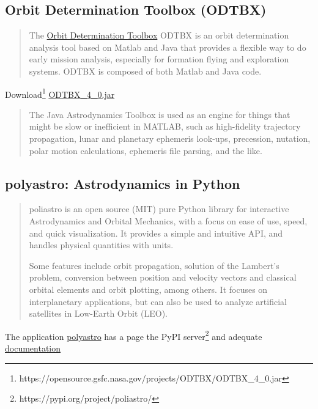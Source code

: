 \documentclass[a4paper,10pt]{article}
\begin{document}
\subsection{Orbit Determination Toolbox (ODTBX)}
\begin{quotation}
The \href{https://opensource.gsfc.nasa.gov/projects/ODTBX/}{Orbit Determination Toolbox} ODTBX is an orbit determination analysis tool based on Matlab and Java that provides a flexible way to do early mission analysis, especially for formation flying and exploration systems. ODTBX is composed of both Matlab and Java code.
\end{quotation}

Download\footnote{https://opensource.gsfc.nasa.gov/projects/ODTBX/ODTBX\_4\_0.jar} \href{https://opensource.gsfc.nasa.gov/projects/ODTBX/ODTBX_4_0.jar}{ODTBX\_4\_0.jar}

\begin{quotation}
The Java
Astrodynamics Toolbox is used as an engine for things that might be slow or inefficient in MATLAB, such as high-fidelity trajectory propagation, lunar and planetary ephemeris look-ups, precession, nutation, polar motion calculations, ephemeris file parsing, and the like.
\end{quotation}

\subsection{polyastro: Astrodynamics in Python}
\begin{quotation}
poliastro is an open source (MIT) pure Python library for interactive Astrodynamics and Orbital Mechanics, with a focus on ease of use, speed, and quick visualization. It provides a simple and intuitive API, and handles physical quantities with units.

Some features include orbit propagation, solution of the Lambert's problem, conversion between position and velocity vectors and classical orbital elements and orbit plotting, among others. It focuses on interplanetary applications, but can also be used to analyze artificial satellites in Low-Earth Orbit (LEO).
\end{quotation}

The application \href{https://pypi.org/project/poliastro/}{polyastro} has a page the PyPI server\footnote{https://pypi.org/project/poliastro/} and adequate \href{https://docs.poliastro.space/en/stable/}{documentation}
\end{document}
